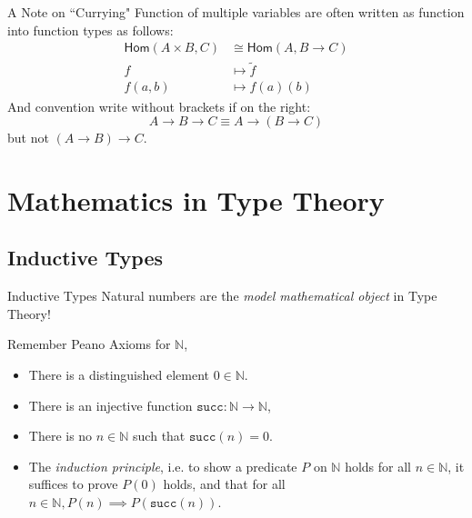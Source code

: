\documentclass[10pt, aspectratio=169]{beamer}
\newcommand{\deq}{\equiv}
\newcommand{\0}{\mathbf{0}}
\newcommand{\1}{\mathbf{1}}
\newcommand{\2}{\mathbf{2}}
\newcommand{\N}{\mathbb{N}}
\newcommand{\Hom}{\mathsf{Hom}}
\begin{document}
\begin{frame}{A Note on ``Currying"}
  Function of multiple variables are often written as function into function types as follows:
  \begin{align*}
    \Hom(A \times B, C) &\cong \Hom(A, B \to C) \\
    f &\mapsto \widetilde f \\
    f(a,b) &\mapsto f(a)(b)
  \end{align*}
  And convention write without brackets if on the right: 
  \[
    A \to B \to C \deq A \to (B \to C)
  \]
  but not $(A \to B) \to C$.
\end{frame}


\section{Mathematics in Type Theory}

\subsection{Inductive Types}

\begin{frame}{Inductive Types}
  Natural numbers are the \emph{model mathematical object} in Type Theory!
  
  Remember Peano Axioms for $\N$,
  \begin{itemize}
    \item There is a distinguished element $0 \in \N$. 
    \item There is an injective function $\mathtt{succ} : \N \to \N$, 
    \item There is no $n \in \N$ such that $\mathtt{succ}(n) = 0$.
    \item The \emph{induction principle}, i.e. to show a predicate $P$ on $\N$ holds for all $n \in \N$,
      it suffices to prove $P(0)$ holds, and that for all $n \in \N, P(n) \implies P(\mathtt{succ} (n))$.
  \end{itemize}
\end{frame}
\end{document}
